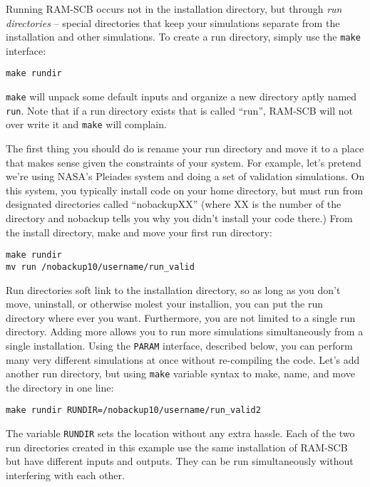 Running RAM-SCB occurs not in the installation directory, but through \textit{run directories} -- special directories that keep your simulations separate from the installation and other simulations. To create a run directory, simply use the {\tt make} interface:
\begin{verbatim}
make rundir
\end{verbatim}
\noindent
{\tt make} will unpack some default inputs and organize a new directory aptly named {\tt run}. Note that if a run directory exists that is called ``run'', RAM-SCB will not over write it and {\tt make} will complain. 

The first thing you should do is rename your run directory and move it to a place that makes sense given the constraints of your system. For example, let's pretend we're using NASA's Pleiades system and doing a set of validation simulations. On this system, you typically install code on your home directory, but must run from designated directories called ``nobackupXX'' (where XX is the number of the directory and nobackup tells you why you didn't install your code there.) From the install directory, make and move your first run directory:
\begin{verbatim}
make rundir
mv run /nobackup10/username/run_valid
\end{verbatim}
\noindent

Run directories soft link to the installation directory, so as long as you don't move, uninstall, or otherwise molest your installion, you can put the run directory where ever you want. Furthermore, you are not limited to a single run directory. Adding more allows you to run more simulations simultaneously from a single installation. Using the {\tt PARAM} interface, described below, you can perform many very different simulations at once without re-compiling the code. Let's add another run directory, but using {\tt make} variable syntax to make, name, and move the directory in one line:
\begin{verbatim}
make rundir RUNDIR=/nobackup10/username/run_valid2
\end{verbatim}
\noindent
The variable {\tt RUNDIR} sets the location without any extra hassle. Each of the two run directories created in this example use the same installation of RAM-SCB but have different inputs and outputs. They can be run simultaneously without interfering with each other.

